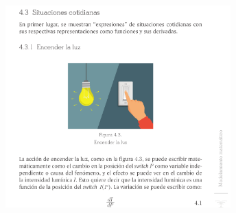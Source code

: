\begin{frame}
	\frametitle{\secname}
	\begin{figure}[ht!]
		\centering
		\includegraphics[height=7.8cm]{vida_cotidiana}
	\end{figure}
\end{frame}